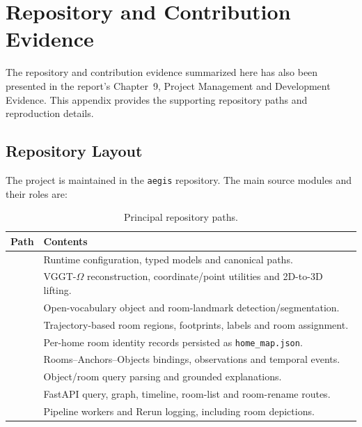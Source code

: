\chapter{Repository and Contribution Evidence}
\label{app:repository}

The repository and contribution evidence summarized here has also been presented in the report's Chapter~9, Project Management and Development Evidence. This appendix provides the supporting repository paths and reproduction details.

\section{Repository Layout}
The project is maintained in the \texttt{aegis} repository. The main source
modules and their roles are:

\begin{table}[H]\centering\small
\caption{Principal repository paths.}\label{tab:appendix-repository}
\begin{tabularx}{\textwidth}{@{}L{4.8cm}Y@{}}\toprule
\textbf{Path}&\textbf{Contents}\\\midrule
{}&Runtime configuration, typed models and canonical paths.\\
&VGGT-$\Omega$ reconstruction, coordinate/point utilities and 2D-to-3D lifting.\\
&Open-vocabulary object and room-landmark detection/segmentation.\\
&Trajectory-based room regions, footprints, labels and room assignment.\\
&Per-home room identity records persisted as \texttt{home\_map.json}.\\
&Rooms--Anchors--Objects bindings, observations and temporal events.\\
&Object/room query parsing and grounded explanations.\\
&FastAPI query, graph, timeline, room-list and room-rename routes.\\
&Pipeline workers and Rerun logging, including room depictions.\\
\bottomrule\end{tabularx}\end{table}

